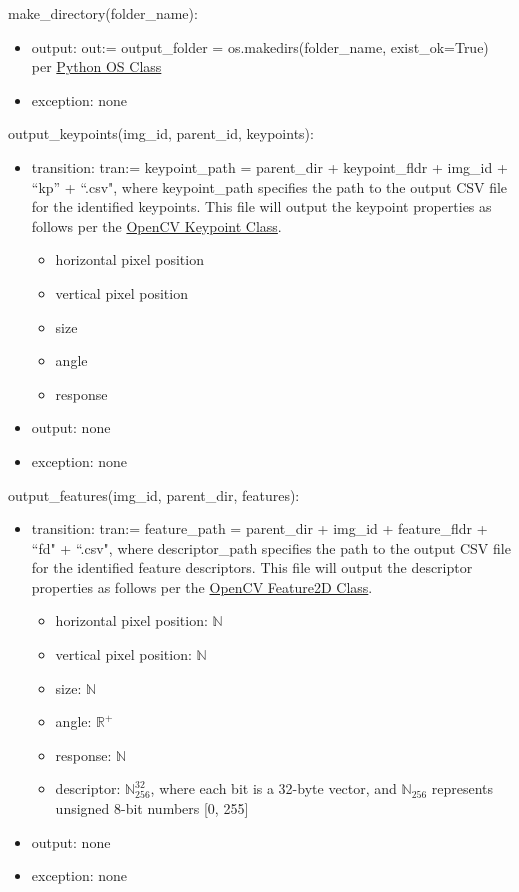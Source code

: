 \documentclass[12pt, titlepage]{article}
\begin{document}
  \noindent make\_directory(folder\_name):
  \begin{itemize}
  \item output: out:= output\_folder = os.makedirs(folder\_name, exist\_ok=True) per \href{https://docs.python.org/3/library/os.html}{Python OS Class}
  \item exception: none 
  \end{itemize}  

  \noindent output\_keypoints(img\_id, parent\_id, keypoints):
  \begin{itemize}
    \item transition: tran:= keypoint\_path = parent\_dir + keypoint\_fldr + img\_id + ``kp'' + ``.csv", where keypoint\_path specifies the 
    path to the output CSV file for the identified keypoints. This file will output the keypoint properties as follows per the 
    \href{https://docs.opencv.org/3.4/d2/d29/classcv_1_1KeyPoint.html}{OpenCV Keypoint Class}.
  
    \begin{itemize}
      \item horizontal pixel position
      \item vertical pixel position
      \item size 
      \item angle
      \item response 
    \end{itemize}
  \item output: none 
  \item exception: none 
  \end{itemize}
  
  
  \noindent output\_features(img\_id, parent\_dir, features):
  \begin{itemize}
    \item transition: tran:= feature\_path = parent\_dir + img\_id + feature\_fldr + ``fd" + ``.csv", where descriptor\_path specifies the 
    path to the output CSV file for the identified feature descriptors. This file will output the descriptor properties 
    as follows per the \href{https://docs.opencv.org/4.x/d0/d13/classcv_1_1Feature2D.html}{OpenCV Feature2D Class}.
    \begin{itemize}
      \item horizontal pixel position: $\mathbb{N}$
      \item vertical pixel position: $\mathbb{N}$
      \item size: $\mathbb{N}$
      \item angle: $\mathbb{R}^{+}$
      \item response: $\mathbb{N}$
      \item descriptor: $\mathbb{N}_{256}^{32}$, where each bit is a 32-byte vector, and 
      $\mathbb{N}_{256}$ represents unsigned 8-bit numbers [0, 255]
    \end{itemize}
  \item output: none 
  \item exception: none 
  \end{itemize}
  
\end{document}
